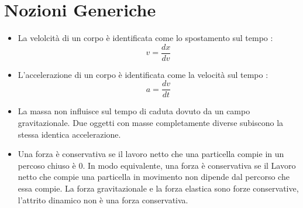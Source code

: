 \documentclass[12pt, a4paper, openany]{book}
\begin{document}
\newpage

\tableofcontents
\newpage

\section*{Nozioni Generiche}

\begin{itemize}
    \item La velolcità di un corpo è identificata come lo spostamento sul tempo
    :
        \begin{equation*}
            v = \frac{dx}{dv}
        \end{equation*}
    \item L'accelerazione di un corpo è identificata come la velocità sul tempo
    :
        \begin{equation*}
            a = \frac{dv}{dt}
        \end{equation*}
    \item La massa non influisce sul tempo di caduta dovuto da un campo 
        gravitazionale. Due oggetti con masse completamente diverse subiscono 
        la stessa identica accelerazione.
    \item Una forza è conservativa se il lavoro netto che una particella compie
    in un percoso chiuso è 0. In modo equivalente, una forza è conservativa 
    se il Lavoro netto che compie una particella in movimento non dipende dal 
    percorso che essa compie. La forza gravitazionale e la forza elastica sono
    forze conservative, l'attrito dinamico non è una forza conservativa.
    

\end{itemize}
\end{document}
